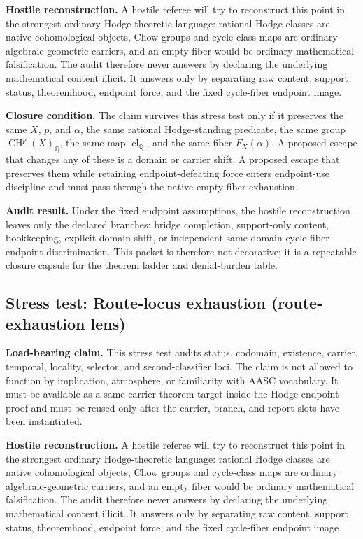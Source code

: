 \documentclass[11pt]{article}
\newcommand{\QQ}{\mathbb{Q}}
\newcommand{\CH}{\operatorname{CH}}
\newcommand{\clQ}{\operatorname{cl}_{\QQ}}
\begin{document}
\par\noindent\textbf{Hostile reconstruction.} A hostile referee will try to reconstruct this point in the strongest ordinary Hodge-theoretic language: rational Hodge classes are native cohomological objects, Chow groups and cycle-class maps are ordinary algebraic-geometric carriers, and an empty fiber would be ordinary mathematical falsification. The audit therefore never answers by declaring the underlying mathematical content illicit. It answers only by separating raw content, support status, theoremhood, endpoint force, and the fixed cycle-fiber endpoint image.

\par\noindent\textbf{Closure condition.} The claim survives this stress test only if it preserves the same $X$, $p$, and $\alpha$, the same rational Hodge-standing predicate, the same group $\CH^p(X)_\QQ$, the same map $\clQ$, and the same fiber $F_X(\alpha)$. A proposed escape that changes any of these is a domain or carrier shift. A proposed escape that preserves them while retaining endpoint-defeating force enters endpoint-use discipline and must pass through the native empty-fiber exhaustion.

\par\noindent\textbf{Audit result.} Under the fixed endpoint assumptions, the hostile reconstruction leaves only the declared branches: bridge completion, support-only content, bookkeeping, explicit domain shift, or independent same-domain cycle-fiber endpoint discrimination. This packet is therefore not decorative; it is a repeatable closure capsule for the theorem ladder and denial-burden table.


\subsection{Stress test: Route-locus exhaustion (route-exhaustion lens)}

\par\noindent\textbf{Load-bearing claim.} This stress test audits status, codomain, existence, carrier, temporal, locality, selector, and second-classifier loci. The claim is not allowed to function by implication, atmosphere, or familiarity with AASC vocabulary. It must be available as a same-carrier theorem target inside the Hodge endpoint proof and must be reused only after the carrier, branch, and report slots have been instantiated.

\par\noindent\textbf{Hostile reconstruction.} A hostile referee will try to reconstruct this point in the strongest ordinary Hodge-theoretic language: rational Hodge classes are native cohomological objects, Chow groups and cycle-class maps are ordinary algebraic-geometric carriers, and an empty fiber would be ordinary mathematical falsification. The audit therefore never answers by declaring the underlying mathematical content illicit. It answers only by separating raw content, support status, theoremhood, endpoint force, and the fixed cycle-fiber endpoint image.
\end{document}
